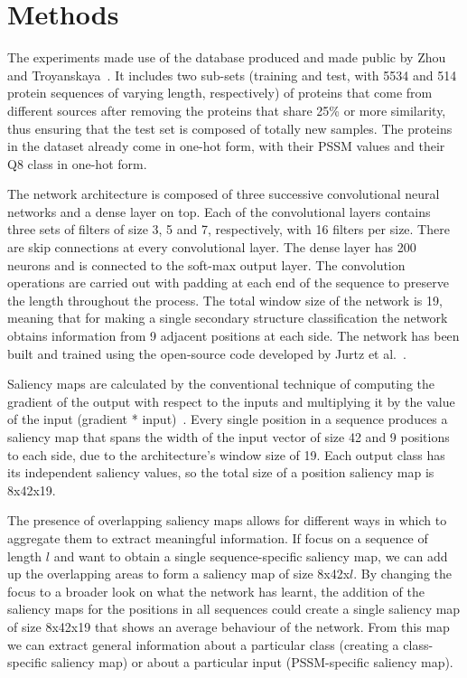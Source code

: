 \documentclass{article}
\begin{document}
\section{Methods}
\label{sec:methods}

The experiments made use of the database produced and made public by Zhou and Troyanskaya~\cite{Zhou2014}. It includes two sub-sets (training and test, with 5534 and 514 protein sequences of varying length, respectively) of proteins that come from different sources after removing the proteins that share 25\% or more similarity, thus ensuring that the test set is composed of totally new samples. The proteins in the dataset already come in one-hot form, with their PSSM values and their Q8 class in one-hot form.

The network architecture is composed of three successive convolutional neural networks and a dense layer on top. Each of the convolutional layers contains three sets of filters of size 3, 5 and 7, respectively, with 16 filters per size. There are skip connections at every convolutional layer. The dense layer has 200 neurons and is connected to the soft-max output layer. The convolution operations are carried out with padding at each end of the sequence to preserve the length throughout the process. The total window size of the network is 19, meaning that for making a single secondary structure classification the network obtains information from 9 adjacent positions at each side. The network has been built and trained using the open-source code developed by Jurtz et al.~\cite{Jurtz2017}.

Saliency maps are calculated by the conventional technique of computing the gradient of the output with respect to the inputs and multiplying it by the value of the input (gradient * input)~\cite{Shrikumar2016}. Every single position in a sequence produces a saliency map that spans the width of the input vector of size 42 and 9 positions to each side, due to the architecture's window size of 19. Each output class has its independent saliency values, so the total size of a position saliency map is 8x42x19.

The presence of overlapping saliency maps allows for different ways in which to aggregate them to extract meaningful information. If focus on a sequence of length $l$ and want to obtain a single sequence-specific saliency map, we can add up the overlapping areas to form a saliency map of size 8x42x$l$. By changing the focus to a broader look on what the network has learnt, the addition of the saliency maps for the positions in all sequences could create a single saliency map of size 8x42x19 that shows an average behaviour of the network. From this map we can extract general information about a particular class (creating a class-specific saliency map) or about a particular input (PSSM-specific saliency map).
\end{document}
